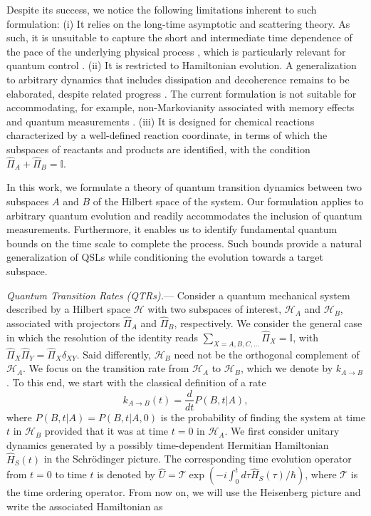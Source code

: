 \documentclass[prl,aps,amssymb,twocolumn,superscriptaddress, notitlepage, longbibliography]{revtex4-2}
\begin{document}
Despite its success, we notice the following limitations inherent to such formulation: (i)
It relies on the long-time asymptotic and scattering theory. As such, it is unsuitable to capture the short and intermediate time dependence of the pace of the underlying physical process \cite{Fonda78,Beau17b,BoseNancy17,Ness21}, which is particularly relevant for quantum control \cite{Rice2000}. (ii) It is restricted to Hamiltonian evolution. A generalization to arbitrary dynamics that includes dissipation and decoherence remains to be elaborated, despite related progress \cite{Christie2024}. The current formulation is not suitable for accommodating, for example, non-Markovianity associated with memory effects \cite{Rivas14} and quantum measurements \cite{Jordan24}.   (iii) It is designed for chemical reactions characterized by a well-defined reaction coordinate, in terms of which the subspaces of reactants and products are identified, with the condition $\hat{\Pi}_A+\hat{\Pi}_B=\mathbb{I}$.



In this work, we formulate a theory of quantum transition dynamics between two subspaces $A$ and $B$ of the Hilbert space of the system. Our formulation applies to arbitrary quantum evolution and readily accommodates the inclusion of quantum measurements. Furthermore, it enables us to identify fundamental quantum bounds on the time scale to complete the process. Such bounds provide a natural generalization of QSLs while conditioning the evolution towards a target subspace.




{\it Quantum Transition Rates (QTRs).}---
Consider a quantum mechanical system described by a Hilbert space $\mathcal{H}$ with two subspaces of interest, $\mathcal{H}_A$ and $\mathcal{H}_B$, associated with projectors $\hat{\Pi}_A$ and $\hat{\Pi}_B$, respectively.
We consider the general case in which the resolution of the identity reads $\sum_{X=A,B,C,\dots}\hat{\Pi}_X=\mathbb{I}$,  with $\hat{\Pi}_X\hat{\Pi}_Y=\hat{\Pi}_X\delta_{XY}$.
Said differently,  $\mathcal{H}_B$ need not be the orthogonal complement of $\mathcal{H}_A$.
We focus on the transition rate from $\mathcal{H}_A$ to $\mathcal{H}_B$, which we denote by $k_{A\rightarrow B}$.
To this end, we start with the classical definition of a rate
\begin{equation}
k_{A\rightarrow B}(t)=\frac{d}{dt}P(B,t|A),
\end{equation}
where $P(B,t|A)=P(B,t|A,0)$ is the probability of finding the system at time $t$ in $\mathcal{H}_B$ provided that it was at time $t=0$ in $\mathcal{H}_A$.
We first consider unitary dynamics generated by a possibly time-dependent Hermitian Hamiltonian
$\hat{H}_S \left( t \right)$ in the Schr\"odinger picture.
The corresponding time evolution operator from $t=0$ to time $t$ is denoted by
$\hat{U}=\mathcal{T}\exp\left(-i\int_0^td\tau\hat{H}_S(\tau)/\hbar\right)$, where $\mathcal{T}$ is the time ordering operator.
From now on, we will use the Heisenberg picture and write the associated Hamiltonian as
\end{document}
